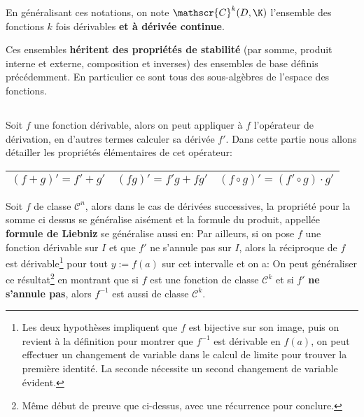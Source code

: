 En généralisant ces notations, on note \(\mathscr{C}^k(D, \K)\) l'ensemble des fonctions \(k\) fois dérivables \textbf{et à dérivée continue}.\<

Ces ensembles \textbf{héritent des propriétés de stabilité} (par somme, produit interne et externe, composition et inverses) des ensembles de base définis précédemment. En particulier ce sont tous des sous-algèbres de l'espace des fonctions.

\subsection*{}

Soit \(f\) une fonction dérivable, alors on peut appliquer à \(f\) l'opérateur de dérivation, en d'autres termes calculer sa dérivée \(f'\). Dans cette partie nous allons détailler les propriétés élémentaires de cet opérateur:
\begin{center}
   \renewcommand{\arraystretch}{1.5}%
   \setlength\arrayrulewidth{0.8pt}

   \begin{tabular}{| c | c | c |}
   \hline
   \((f + g)' = f' + g'\) & \((fg)' = f'g + fg'\)  & \((f \circ g)' = (f' \circ g) \cdot g'\) \\ [1ex]
   \hline
   \end{tabular}
\end{center}  
Soit \(f\) de classe \(\mathscr{C}^n\), alors dans le cas de dérivées successives, la propriété pour la somme ci dessus se généralise aisément et la formule du produit, appellée \textbf{formule de Liebniz} se généralise aussi en:
Par ailleurs, si on pose \(f\) une fonction dérivable sur \(I\) et que \(f'\) ne s'annule pas sur \(I\), alors la réciproque de \(f\) est dérivable\footnote[1]{Les deux hypothèses impliquent que \(f\) est bijective sur son image, puis on revient à la définition pour montrer que \(f^{-1}\) est dérivable en \(f(a)\), on peut effectuer un changement de variable dans le calcul de limite pour trouver la première identité. La seconde nécessite un second changement de variable évident.} pour tout \(y := f(a)\) sur cet intervalle et on a:
On peut généraliser ce résultat\footnote[2]{Même début de preuve que ci-dessus, avec une récurrence pour conclure.} en montrant que si \(f\) est une fonction de classe \(\mathscr{C}^k\) et si \(f'\) \textbf{ne s'annule pas}, alors \(f^{-1}\) est aussi de classe \(\mathscr{C}^k\).\<

